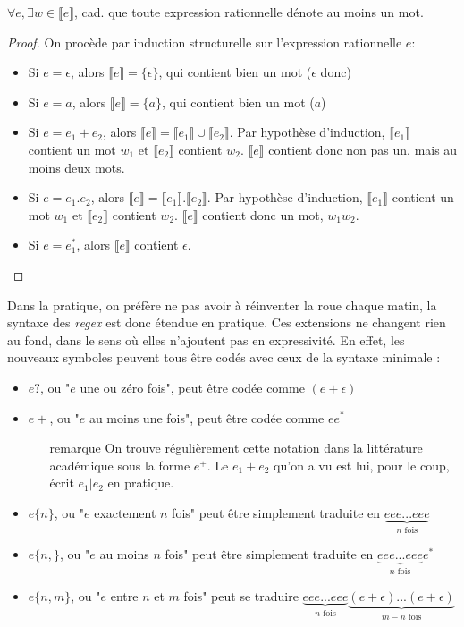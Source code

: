 \begin{theorem}
$\forall e, \exists w \in \llbracket e \rrbracket$, cad. que toute expression rationnelle dénote au moins un mot.
\end{theorem}
\begin{proof}
On procède par induction structurelle sur l'expression rationnelle $e$:

\begin{itemize}
\item Si $e = \epsilon$, alors $\llbracket e \rrbracket = \{\epsilon\}$, qui contient bien un mot ($\epsilon$ donc)
\item Si $e = a$, alors $\llbracket e \rrbracket = \{a\}$, qui contient bien un mot ($a$)
\item Si $e = e_1 + e_2$, alors $\llbracket e \rrbracket = \llbracket e_1 \rrbracket \cup \llbracket e_2 \rrbracket$. Par hypothèse d'induction, $\llbracket e_1 \rrbracket$ contient un mot $w_1$ et $\llbracket e_2 \rrbracket$ contient $w_2$. $\llbracket e \rrbracket$ contient donc non pas un, mais au moins deux mots.
\item Si $e = e_1.e_2$, alors $\llbracket e \rrbracket = \llbracket e_1 \rrbracket . \llbracket e_2 \rrbracket$. Par hypothèse d'induction, $\llbracket e_1 \rrbracket$ contient un mot $w_1$ et $\llbracket e_2 \rrbracket$ contient $w_2$. $\llbracket e \rrbracket$ contient donc un mot, $w_1w_2$.
\item Si $e = e_1^*$, alors $\llbracket e \rrbracket$ contient $\epsilon$.
\end{itemize}
\end{proof}

Dans la pratique, on préfère ne pas avoir à réinventer la roue chaque matin, la syntaxe des \textit{regex} est donc étendue en pratique. Ces extensions ne changent rien au fond, dans le sens où elles n'ajoutent pas en expressivité. En effet, les nouveaux symboles peuvent tous être codés avec ceux de la syntaxe minimale : 

\begin{itemize}
\item $e?$, ou "$e$ une ou zéro fois", peut être codée comme $(e + \epsilon)$
\item $e+$, ou "$e$ au moins une fois", peut être codée comme $ee^*$
\begin{itemize} \item [remarque] On trouve régulièrement cette notation dans la littérature académique sous la forme $e^+$. Le $e_1 + e_2$ qu'on a vu est lui, pour le coup, écrit $e_1 | e_2$ en pratique. \end{itemize}
\item $e\{n\}$, ou "$e$ exactement $n$ fois" peut être simplement traduite en $\underbrace{eee...eee}_\text{$n$ fois}$ 
\item $e\{n,\}$, ou "$e$ au moins $n$ fois" peut être simplement traduite en $\underbrace{eee...eee}_\text{$n$ fois}e^*$ 
\item $e\{n,m\}$, ou "$e$ entre $n$ et $m$ fois" peut se traduire $\underbrace{eee...eee}_\text{$n$ fois}\underbrace{(e+\epsilon)...(e+\epsilon)}_\text{$m-n$ fois}$
\end{itemize}

